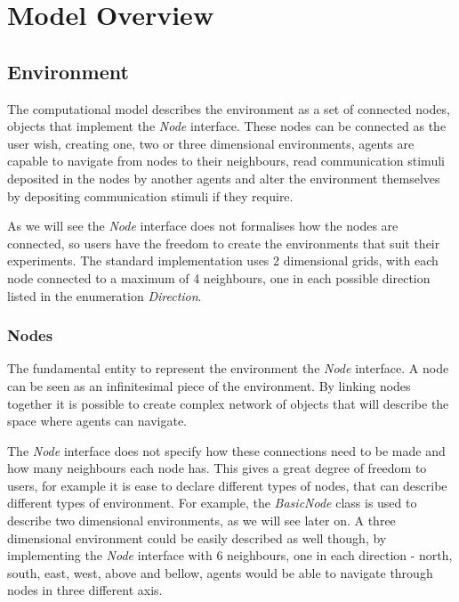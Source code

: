 
\chapter{Model Overview}
\label{ch:model-overview}

\section{Environment}

The computational model describes the environment as a set of connected nodes, objects that implement the \emph{Node} interface. These nodes can be connected as the user wish, creating one, two or three dimensional environments, agents are capable to navigate from nodes to their neighbours, read communication stimuli deposited in the nodes by another agents and alter the environment themselves by depositing communication stimuli if they require.

As we will see the \emph{Node} interface does not formalises how the nodes are connected, so users have the freedom to create the environments that suit their experiments. The standard implementation uses 2 dimensional grids, with each node connected to a maximum of 4 neighbours, one in each possible direction listed in the enumeration \emph{Direction}.

\subsection{Nodes}

The fundamental entity to represent the environment the \emph{Node} interface. A node can be seen as an infinitesimal piece of the environment. By linking nodes together it is possible to create complex network of objects that will describe the space where agents can navigate.

The \emph{Node} interface does not specify how these connections need to be made and how many neighbours each node has. This gives a great degree of freedom to users, for example it is ease to declare different types of nodes, that can describe different types of environment. For example, the \emph{BasicNode} class is used to describe two dimensional environments, as we will see later on. A three dimensional environment could be easily described as well though, by implementing the \emph{Node} interface with 6 neighbours, one in each direction - north, south, east, west, above and bellow, agents would be able to navigate through nodes in three different axis.

